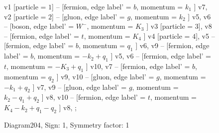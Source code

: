 \documentclass{revtex4}
\begin{document}
\begin{figure}[!htb]
\begin{center}
{    %
v1 [particle = \(1\)] -- [fermion, edge label' = \(b\), momentum = \(k_{1}\) ] v7, 
v2 [particle = \(2\)] -- [gluon, edge label' = \(g\), momentum = \(k_{2}\) ] v5, 
v6 -- [boson, edge label' = \(W^{-}\), momentum = \(K_{3}\) ] v3 [particle = \(3\)], 
v8 -- [fermion, edge label' = \(t\), momentum = \(K_{4}\) ] v4 [particle = \(4\)], 
v5 -- [fermion, edge label' = \(b\), momentum = \(q_{1}\) ] v6, 
v9 -- [fermion, edge label' = \(b\), momentum = \(-k_{2} + q_{1}\) ] v5, 
v6 -- [fermion, edge label' = \(t\), momentum = \(-K_{3} + q_{1}\) ] v10, 
v7 -- [fermion, edge label' = \(b\), momentum = \(q_{2}\) ] v9, 
v10 -- [gluon, edge label' = \(g\), momentum = \(-k_{1} + q_{2}\) ] v7, 
v9 -- [gluon, edge label' = \(g\), momentum = \(k_{2} - q_{1} + q_{2}\) ] v8, 
v10 -- [fermion, edge label' = \(t\), momentum = \(K_{4} - k_{2} + q_{1} - q_{2}\) ] v8, 
};
\end{center}
\caption{Diagram204, Sign: 1, Symmetry factor: 1}
\end{figure}
\newpage
\end{document}
